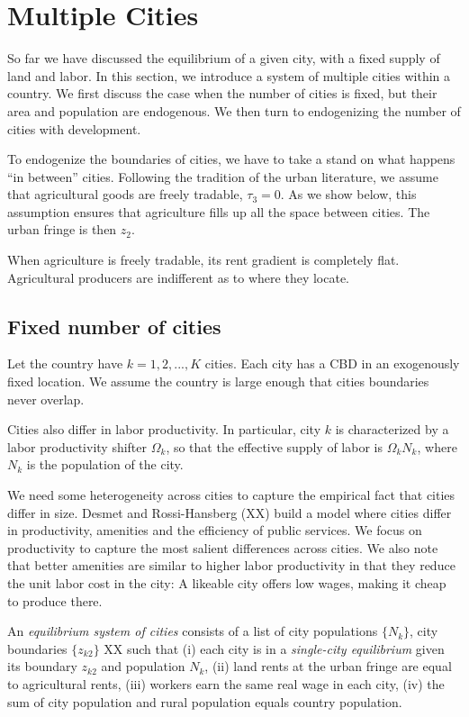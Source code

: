 \documentclass[12pt]{article}
\begin{document}
\section{Multiple Cities}
So far we have discussed the equilibrium of a given city, with a fixed supply of land and labor. In this section, we introduce a system of multiple cities within a country. We first discuss the case when the number of cities is fixed, but their area and population are endogenous. We then turn to endogenizing the number of cities with development.

To endogenize the boundaries of cities, we have to take a stand on what happens ``in between'' cities. Following the tradition of the urban literature, we assume that agricultural goods are freely tradable, $\tau_3=0$. As we show below, this assumption ensures that agriculture fills up all the space between cities. The urban fringe is then $z_2$.

When agriculture is freely tradable, its rent gradient is completely flat. Agricultural producers are indifferent as to where they locate.

\subsection{Fixed number of cities}
Let the country have $k=1,2,...,K$ cities. Each city has a CBD in an exogenously fixed location. We assume the country is large enough that cities boundaries never overlap. 

Cities also differ in labor productivity. In particular, city $k$ is characterized by a labor productivity shifter $\Omega_k$, so that the effective supply of labor is $\Omega_kN_k$, where $N_k$ is the population of the city. 

We need some heterogeneity across cities to capture the empirical fact that cities differ in size. Desmet and Rossi-Hansberg (XX) build a model where cities differ in productivity, amenities and the efficiency of public services. We focus on productivity to capture the most salient differences across cities. We also note that better amenities are similar to higher labor productivity in that they reduce the unit labor cost in the city: A likeable city offers low wages, making it cheap to produce there.

An \emph{equilibrium system of cities} consists of a list of city populations $\{N_k\}$, city boundaries $\{z_{k2}\}$ XX
such that
(i) each city is in a \emph{single-city equilibrium} given its boundary $z_{k2}$ and population $N_k$, (ii) land rents at the urban fringe are equal to agricultural rents, (iii) workers earn the same real wage in each city, (iv) the sum of city population and rural population equals country population.
\end{document}
